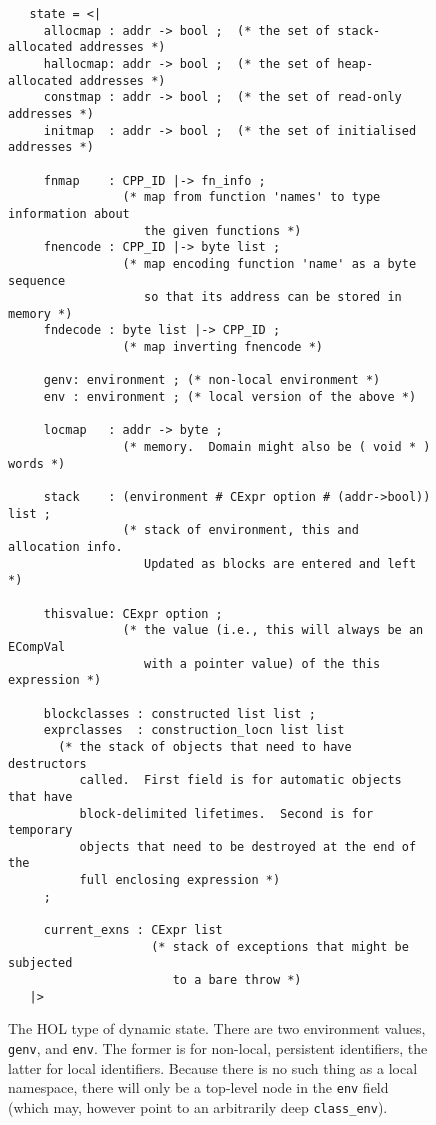 \documentclass[11pt]{article}
\begin{document}
\begin{figure}[htbp]
\footnotesize
\begin{verbatim}
   state = <|
     allocmap : addr -> bool ;  (* the set of stack-allocated addresses *)
     hallocmap: addr -> bool ;  (* the set of heap-allocated addresses *)
     constmap : addr -> bool ;  (* the set of read-only addresses *)
     initmap  : addr -> bool ;  (* the set of initialised addresses *)

     fnmap    : CPP_ID |-> fn_info ;
                (* map from function 'names' to type information about
                   the given functions *)
     fnencode : CPP_ID |-> byte list ;
                (* map encoding function 'name' as a byte sequence
                   so that its address can be stored in memory *)
     fndecode : byte list |-> CPP_ID ;
                (* map inverting fnencode *)

     genv: environment ; (* non-local environment *)
     env : environment ; (* local version of the above *)

     locmap   : addr -> byte ;
                (* memory.  Domain might also be ( void * ) words *)

     stack    : (environment # CExpr option # (addr->bool)) list ;
                (* stack of environment, this and allocation info.  
                   Updated as blocks are entered and left *)

     thisvalue: CExpr option ;
                (* the value (i.e., this will always be an ECompVal
                   with a pointer value) of the this expression *)

     blockclasses : constructed list list ;
     exprclasses  : construction_locn list list
       (* the stack of objects that need to have destructors
          called.  First field is for automatic objects that have
          block-delimited lifetimes.  Second is for temporary
          objects that need to be destroyed at the end of the
          full enclosing expression *)
     ;

     current_exns : CExpr list
                    (* stack of exceptions that might be subjected
                       to a bare throw *)
   |>
\end{verbatim}
  \caption{The HOL type of dynamic state.  There are two environment
    values, \texttt{genv}, and \texttt{env}.  The former is for
    non-local, persistent identifiers, the latter for local
    identifiers.  Because there is no such thing as a local namespace,
    there will only be a top-level node in the \texttt{env} field
    (which may, however point to an arbitrarily deep
    \texttt{class_env}).}
\label{fig:state-type}
\end{figure}
\end{document}
